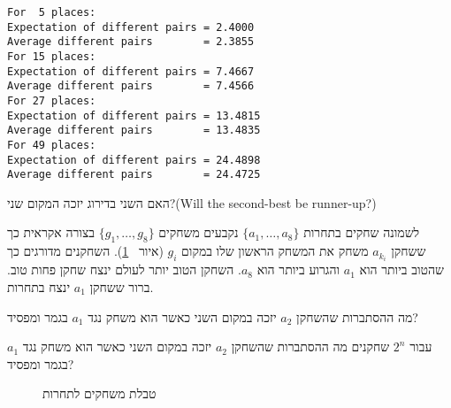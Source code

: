 \newpage

\sml{}

\begin{verbatim}
For  5 places:
Expectation of different pairs = 2.4000
Average different pairs        = 2.3855
For 15 places:
Expectation of different pairs = 7.4667
Average different pairs        = 7.4566
For 27 places:
Expectation of different pairs = 13.4815
Average different pairs        = 13.4835
For 49 places:
Expectation of different pairs = 24.4898
Average different pairs        = 24.4725
\end{verbatim}


\begin{prob}{האם השני בדירוג יזכה המקום שני?}{}{(Will the second-best be runner-up?)}

לשמונה שחקים בתחרות 
$\{a_1,\ldots,a_8\}$
נקבעים משחקים 
$\{g_1,\ldots,g_8\}$
בצורה אקראית כך ששחקן
$a_{k_{i}}$
משחק את המשחק הראשון שלו במקום
$g_{i}$
(איור%
~\ref{f.tournament}).
השחקנים מדורגים כך שהטוב ביותר הוא 
$a_1$
והגרוע ביותר הוא 
$a_8$.
השחקן הטוב יותר לעולם ינצח שחקן פחות טוב. ברור ששחקן
$a_1$
ינצח בתחרות.

מה ההסתברות שהשחקן
$a_2$
יזכה במקום השני כאשר הוא משחק נגד 
$a_1$
בגמר ומפסיד?

עבור
$2^n$
שחקנים מה ההסתברות שהשחקן
$a_2$
יזכה במקום השני כאשר הוא משחק נגד 
$a_1$
בגמר ומפסיד?
\begin{figure}[tb]
\begin{center}
\end{center}
\caption{טבלת משחקים לתחרות}\label{f.tournament}
\end{figure}
\end{prob}

